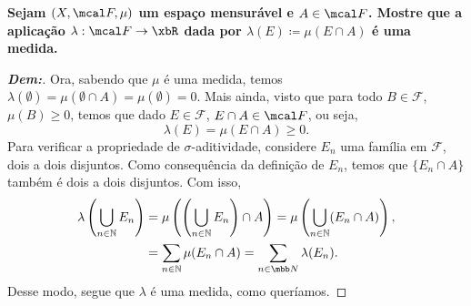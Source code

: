 \bigline
\textbf{Sejam $(X, \mcal F, \mu)$ um espaço mensurável e $A \in \mcal F$. 
Mostre que a aplicação $\lambda: \mcal F \rightarrow \xbR$ dada por 
$\lambda(E)\coloneq \mu(E \cap A)$ é uma medida.}
\begin{proof}[\textbf{Dem:}]
Ora, sabendo que $\mu$ é uma medida, temos 
$\lambda(\emptyset) = \mu(\emptyset \cap A) = \mu(\emptyset) = 0$. Mais ainda, 
visto que para todo $B \in \mathcal F$, $\mu(B) \ge 0$, temos que dado $E \in \mathcal F$,
$E \cap A \in \mcal F$, ou seja, 
$$\lambda(E) = \mu(E \cap A) \ge 0.$$ 
Para verificar a propriedade de $\sigma$-aditividade, considere ${E_n}$ uma família em 
$\mathcal F$, dois a dois disjuntos. Como consequência da definição de ${E_n}$, temos que 
$\{E_n \cap A\}$ também é dois a dois disjuntos. Com isso,
\begin{align*}
   \lambda\left(\bigcup\limits_{n \in \mathbb N} E_n\right) &= 
   \mu\left(\left(\bigcup\limits_{n \in \mathbb N} E_n\right)\cap A\right) = 
   \mu\left(\bigcup\limits_{n \in \mathbb N} (E_n \cap A)\right),\\
   &=\sum_{n \in \mathbb N}\mu(E_n \cap A)=\sum_{n\in\mbb N}\lambda(E_n).
\end{align*}
Desse modo, segue que $\lambda$ é uma medida, como queríamos.
\end{proof}
\biglinend

